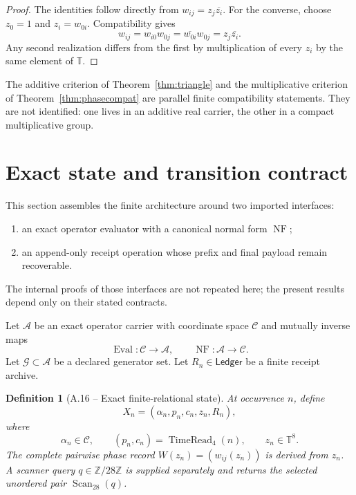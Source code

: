 \documentclass[11pt,letterpaper]{article}
\theoremstyle{relationstyle}
\newtheorem{definition}[theorem]{Definition}
\newcommand{\Z}{\mathbb{Z}}
\newcommand{\T}{\mathbb{T}}
\newcommand{\NF}{\operatorname{NF}}
\newcommand{\Eval}{\operatorname{Eval}}
\newcommand{\TimeRead}{\operatorname{TimeRead}_4}
\newcommand{\Scan}{\operatorname{Scan}_{28}}
\newcommand{\Ledger}{\mathsf{Ledger}}
\newcommand{\Ztwentyeight}{\Z/28\Z}
\begin{document}
\begin{proof}
The identities follow directly from $w_{ij}=z_j\overline{z_i}$.  For the converse, choose $z_0=1$ and $z_i=w_{0i}$.  Compatibility gives
\[
w_{ij}=w_{i0}w_{0j}=\overline{w_{0i}}w_{0j}=z_j\overline{z_i}.
\]
Any second realization differs from the first by multiplication of every $z_i$ by the same element of $\T$.
\end{proof}

The additive criterion of Theorem~\ref{thm:triangle} and the multiplicative criterion of Theorem~\ref{thm:phasecompat} are parallel finite compatibility statements.  They are not identified: one lives in an additive real carrier, the other in a compact multiplicative group.

\section{Exact state and transition contract}\label{sec:state}

This section assembles the finite architecture around two imported interfaces:
\begin{enumerate}
  \item an exact operator evaluator with a canonical normal form $\NF$;
  \item an append-only receipt operation whose prefix and final payload remain recoverable.
\end{enumerate}
The internal proofs of those interfaces are not repeated here; the present results depend only on their stated contracts.

Let $\mathcal A$ be an exact operator carrier with coordinate space $\mathcal C$ and mutually inverse maps
\[
\Eval:\mathcal C\longrightarrow\mathcal A,
\qquad
\NF:\mathcal A\longrightarrow\mathcal C.
\]
Let $\mathcal G\subset\mathcal A$ be a declared generator set.  Let $R_n\in\Ledger$ be a finite receipt archive.

\begin{definition}[A.16 -- Exact finite-relational state]\label{def:state}
At occurrence $n$, define
\[
X_n=(\alpha_n,p_n,c_n,z_n,R_n),
\]
where
\[
\alpha_n\in\mathcal C,
\qquad
(p_n,c_n)=\TimeRead(n),
\qquad
z_n\in\T^8.
\]
The complete pairwise phase record $W(z_n)=(w_{ij}(z_n))$ is derived from $z_n$.  A scanner query $q\in\Ztwentyeight$ is supplied separately and returns the selected unordered pair $\Scan(q)$.
\end{definition}
\end{document}
